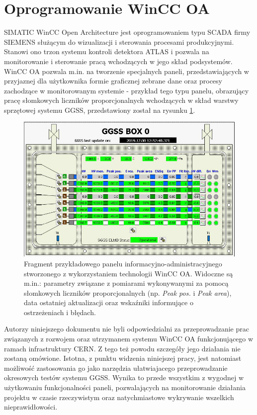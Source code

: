 \section{Oprogramowanie WinCC OA}
SIMATIC WinCC Open Architecture jest oprogramowaniem typu SCADA firmy SIEMENS służącym do wizualizacji i sterowania procesami produkcyjnymi. Stanowi ono trzon systemu kontroli detektora ATLAS i pozwala na monitorowanie i sterowanie pracą wchodzących w jego skład podsystemów. WinCC OA pozwala m.in. na tworzenie specjalnych paneli, przedstawiających w przyjaznej dla użytkownika formie graficznej zebrane dane oraz procesy zachodzące w monitorowanym systemie - przykład tego typu panelu, obrazujący pracę słomkowych liczników proporcjonalnych wchodzących w skład warstwy sprzętowej systemu GGSS, przedstawiony został na rysunku \ref{fig:winccoa_panel_example}.

\begin{figure}[H]
\centering
\includegraphics[width=\textwidth]{components/ggss_images/winccoa_panel.png}
\caption{Fragment przykładowego panelu informacyjno-administracyjnego stworzonego z wykorzystaniem technologii WinCC OA. Widoczne są m.in.: parametry związane z pomiarami wykonywanymi za pomocą słomkowych liczników proporcjonalnych (np. \emph{Peak pos.} i \emph{Peak area}), data ostatniej aktualizacji oraz wskaźniki informujące o ostrzeżeniach i błędach.}
\label{fig:winccoa_panel_example}
\end{figure}


Autorzy niniejszego dokumentu nie byli odpowiedzialni za przeprowadzanie prac związanych z rozwojem oraz utrzymanem systemu WinCC OA funkcjonującego w ramach infrastruktury CERN. Z tego też powodu szczegóły jego działania nie zostaną omówione. Istotna, z punktu widzenia niniejszej pracy, jest natomiast możliwość zastosowania go jako narzędzia ułatwiajacego przeprowadzanie okresowych testów systemu GGSS. Wynika to przede wszystkim z wygodnej w użytkowaniu funkcjonalności paneli, pozwalających na monitorowanie działania projektu w czasie rzeczywistym oraz natychmiastowe wykrywanie wszelkich nieprawidłowości. 



